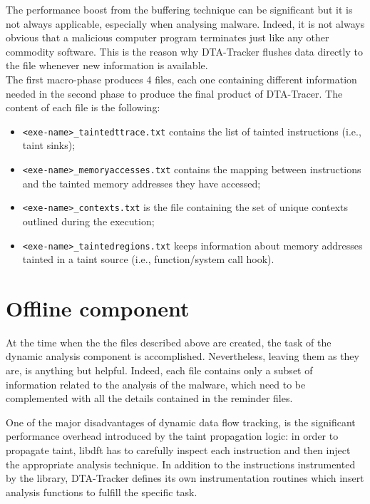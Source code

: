 \documentclass[LaM,binding=0.6cm]{sapthesis}
\begin{document}
The performance boost from the buffering technique can be significant but it is not always applicable, especially when analysing malware. Indeed, it is not always obvious that a malicious computer program terminates just like any other commodity software. This is the reason why {\sf DTA-Tracker} flushes data directly to the file whenever new information is available.\\

The first macro-phase produces 4 files, each one containing different information needed in the second phase to produce the final product of DTA-Tracer. The content of each file is the following:
\begin{itemize}
\item \texttt{<exe-name>\_taintedttrace.txt} contains the list of tainted instructions (i.e., taint sinks);
\item \texttt{<exe-name>\_memoryaccesses.txt} contains the mapping between instructions and the tainted memory addresses they have accessed;
\item \texttt{<exe-name>\_contexts.txt} is the file containing the set of unique contexts outlined during the execution;
\item \texttt{<exe-name>\_taintedregions.txt} keeps information about memory addresses tainted in a taint source (i.e., function/system call hook).
\end{itemize}

\section{Offline component}
At the time when the the files described above are created, the task of the dynamic analysis component is accomplished. Nevertheless, leaving them as they are, is anything but helpful. Indeed, each file contains only a subset of information related to the analysis of the malware, which need to be complemented with all the details contained in the reminder files.

One of the major disadvantages of dynamic data flow tracking, is the significant performance overhead introduced by the taint propagation logic: in order to propagate taint, libdft has to carefully inspect each instruction and then inject the appropriate analysis technique. In addition to the instructions instrumented by the library, {\sf DTA-Tracker} defines its own instrumentation routines which insert analysis functions to fulfill the specific task.\\
\end{document}
